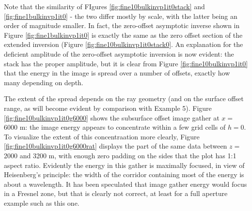 




Note that the similarity of FIgures \ref{fig:fine10bulkinvp1it0stack}
and \ref{fig:fine1bulkinvp1it0} - the two differ mostly by scale, with
the latter being an order of magnitude smaller. In fact, the
zero-offset asymptotic inverse shown in Figure \ref{fig:fine1bulkinvp1it0} is
exactly the same as the zero offset section of the extended inversion
(Figure \ref{fig:fine10bulkinvp1it0stack0}. An explanation for the deficient
amplitude of the zero-offset asymptotic inversion is now evident: the
stack has the proper amplitude, but it is clear from Figure
\ref{fig:fine10bulkinvp1it0} that the energy in the image is spread
over a number of offsets, exactly how many depending on depth.

The extent of the spread depends on the ray geometry (and on the surface
offset range, as will become evident by comparison with Example
5). Figure \ref{fig:fine10bulkinvp1it0g6000} shows the subsurface
offset image gather at $x=$ 6000 m: the image energy appears to
concentrate within a few grid cells of $h=$0. To visualize the extent
of this concentraation more clearly, Figure
\ref{fig:fine10bulkinvp1it0g6000rat} displays the part of the same
data between $z=$ 2000 and 3200 m, with enough zero padding on the
sides that the plot has 1:1 aspect ratio. Evidently the energy in this
gather is maximally focused, in view of Heisenberg's principle: the
width of the corridor containing most of the energy is about a
wavelength. It has been speculated that image gather energy would
focus in a Fresnel zone, but that is clearly not correct, at least for
a full aperture example such as this one.

